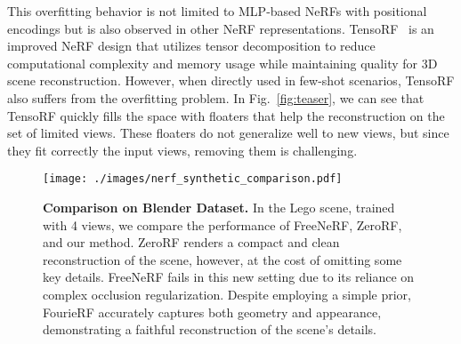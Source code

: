 This overfitting behavior is not limited to MLP-based NeRFs with positional encodings but is also observed in other NeRF representations. TensoRF~\cite{Chen2022ECCV} is an improved NeRF design that utilizes tensor decomposition to reduce computational complexity and memory usage while maintaining quality for 3D scene reconstruction. However, when directly used in few-shot scenarios, TensoRF also suffers from the overfitting problem.
In Fig.~\ref{fig:teaser}, we can see that TensoRF quickly fills the space with floaters that help the reconstruction on the set of limited views. These floaters do not generalize well to new views, but since they fit correctly the input views, removing them is challenging.



\begin{figure*}[t]
	\centering
    \vspace{-1em}
	\texttt{[image: ./images/nerf\_synthetic\_comparison.pdf]}
	\caption{\textbf{Comparison on Blender Dataset.} In the Lego scene, trained with 4 views, we compare the performance of FreeNeRF, ZeroRF, and our method. ZeroRF renders a compact and clean reconstruction of the scene, however, at the cost of omitting some key details. FreeNeRF fails in this new setting due to its reliance on complex occlusion regularization. Despite employing a simple prior, FourieRF accurately captures both geometry and appearance, demonstrating a faithful reconstruction of the scene's details.}
	\label{fig:blender-qualitative}
\end{figure*}

